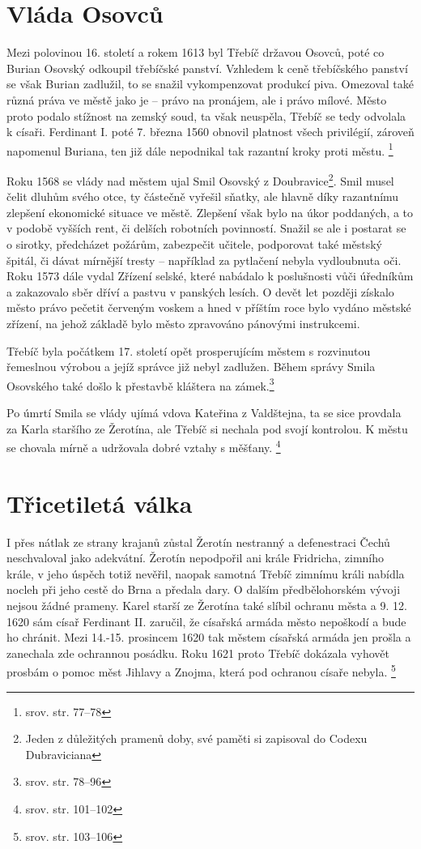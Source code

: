 \documentclass[a4paper,oneside,12pt]{report}
\begin{document}
\section{Vláda Osovců}

Mezi polovinou 16. století a rokem 1613 byl Třebíč državou Osovců, poté co Burian Osovský odkoupil třebíčské panství.
Vzhledem k ceně třebíčského panství se však Burian zadlužil, to se snažil vykompenzovat produkcí piva.
Omezoval také různá práva ve městě jako je -- právo na pronájem, ale i právo mílové.
Město proto podalo stížnost na zemský soud, ta však neuspěla, Třebíč se tedy odvolala k císaři.
Ferdinant I. poté 7. března 1560 obnovil platnost všech privilégií, zároveň napomenul Buriana, ten již dále nepodnikal tak razantní kroky proti městu. \footnote{srov. \cite{Uhlir1978} str. 77--78}

Roku 1568 se vlády nad městem ujal Smil Osovský z Doubravice\footnote{Jeden z důležitých pramenů doby, své paměti si zapisoval do Codexu Dubraviciana}.
Smil musel čelit dluhům svého otce, ty částečně vyřešil sňatky, ale hlavně díky razantnímu zlepšení ekonomické situace ve městě.
Zlepšení však bylo na úkor poddaných, a to v podobě vyšších rent, či delších robotních povinností.
Snažil se ale i postarat se o sirotky, předcházet požárům, zabezpečit učitele, podporovat také městský špitál, či dávat mírnější tresty -- například za pytlačení nebyla vydloubnuta oči.
Roku 1573 dále vydal Zřízení selské, které nabádalo k poslušnosti vůči úředníkům a zakazovalo sběr dříví a pastvu v panských lesích.
O devět let později získalo město právo pečetit červeným voskem a hned v příštím roce bylo vydáno městské zřízení, na jehož základě bylo město zpravováno pánovými instrukcemi.

Třebíč byla počátkem 17. století opět prosperujícím městem s rozvinutou řemeslnou výrobou a jejíž správce již nebyl zadlužen.
Během správy Smila Osovského také došlo k přestavbě kláštera na zámek.\footnote{srov. \cite{Uhlir1978} str. 78--96}

Po úmrtí Smila se vlády ujímá vdova Kateřina z Valdštejna, ta se sice provdala za Karla staršího ze Žerotína, ale Třebíč si nechala pod svojí kontrolou.
K městu se chovala mírně a udržovala dobré vztahy s měšťany. \footnote{srov. \cite{Uhlir1978} str. 101--102}

\section{Třicetiletá válka}

I přes nátlak ze strany krajanů zůstal Žerotín nestranný a defenestraci Čechů neschvaloval jako adekvátní.
Žerotín nepodpořil ani krále Fridricha, zimního krále, v jeho úspěch totiž nevěřil, naopak samotná Třebíč zimnímu králi nabídla nocleh při jeho cestě do Brna a předala dary.
O dalším předbělohorském vývoji nejsou žádné prameny.
Karel starší ze Žerotína také slíbil ochranu města a 9. 12. 1620 sám císař Ferdinant II. zaručil, že císařská armáda město nepoškodí a bude ho chránit.
Mezi 14.-15. prosincem 1620 tak městem císařská armáda jen prošla a zanechala zde ochrannou posádku.
Roku 1621 proto Třebíč dokázala vyhovět prosbám o pomoc měst Jihlavy a Znojma, která pod ochranou císaře nebyla. \footnote{srov. \cite{Uhlir1978} str. 103--106}
\end{document}
